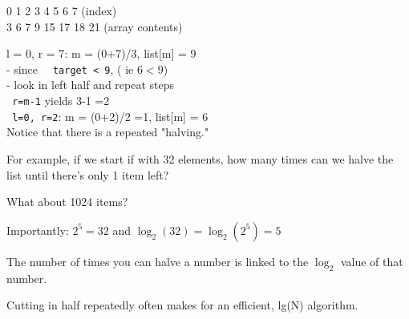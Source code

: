 \documentclass[14pt]{article} %
\begin{document}
 
0  1  2   3   4    5   6    7     (index)  \\
3  6  7   9  15  17  18   21   (array contents)

l = 0, r = 7:    m = (0+7)/3,  list[m] = 9  \\
- since \lstinline!  target < 9!,   ( ie $6 < 9$)  \\  
- look in left half and repeat steps  \\ 


\lstinline! r=m-1! yields  3-1 =2  \\
\lstinline! l=0, r=2!:       m = (0+2)/2 =1,  list[m] = 6  \\


Notice that there is a repeated "halving."

For example, if we start if with 32 elements, how many times can we halve the list until there's only 1 item left?

What about 1024 items?


Importantly:   $2^5 = 32$   and $\log_2(32) = \log_2( 2^5)  = 5$

The number of times you can halve a number is linked to the $\log_2$ value of that number.

 
 Cutting in half repeatedly often makes for an efficient, lg(N) algorithm.
\end{document}
